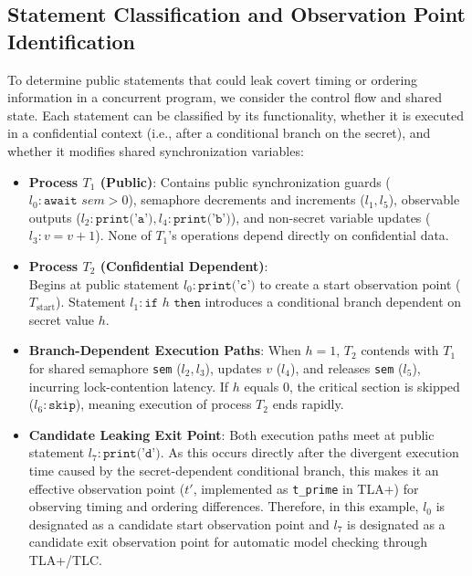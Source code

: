 \documentclass[a4paper,12pt]{report}
\begin{document}
\subsection{Statement Classification and Observation Point Identification}
To determine public statements that could leak covert timing or ordering information in a concurrent program, we consider the control flow and shared state. Each statement can be classified by its functionality, whether it is executed in a confidential context (i.e., after a conditional branch on the secret), and whether it modifies shared synchronization variables:
\begin{itemize}[itemsep=0.2em, topsep=0.15em]
    \item \textbf{Process $T_1$ (Public)}: Contains public synchronization guards ($l_0: \texttt{await } sem > 0$), semaphore decrements and increments ($l_1, l_5$), observable outputs ($l_2: \texttt{print('a')}, l_4: \texttt{print('b')}$), and non-secret variable updates ($l_3: v = v + 1$). None of $T_1$'s operations depend directly on confidential data.
    \item \textbf{Process $T_2$ (Confidential Dependent)}: \\ Begins at public statement $l_0: \texttt{print('c')}$ to create a start observation point ($T_{\text{start}}$). Statement $l_1: \texttt{if } h \texttt{ then}$ introduces a conditional branch dependent on secret value $h$.
    \item \textbf{Branch-Dependent Execution Paths}: When $h = 1$, $T_2$ contends with $T_1$ for shared semaphore \texttt{sem} ($l_2, l_3$), updates $v$ ($l_4$), and releases \texttt{sem} ($l_5$), incurring lock-contention latency. If $h$ equals 0, the critical section is skipped ($l_6: \texttt{skip}$), meaning execution of process $T_2$ ends rapidly.
    \item \textbf{Candidate Leaking Exit Point}: Both execution paths meet at public statement $l_7: \texttt{print('d')}$. As this occurs directly after the divergent execution time caused by the secret-dependent conditional branch, this makes it an effective observation point ($t'$, implemented as \texttt{t\_prime} in TLA+) for observing timing and ordering differences. Therefore, in this example, $l_0$ is designated as a candidate start observation point and $l_7$ is designated as a candidate exit observation point for automatic model checking through TLA+\slash TLC.
\end{itemize}

\end{document}
